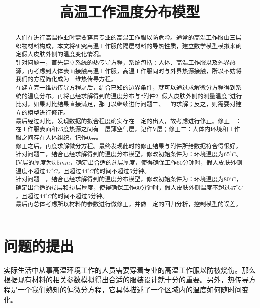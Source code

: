 \documentclass[bwprint]{cumcmthesis}
\title{高温工作温度分布模型}
\begin{document}
 \maketitle
 \begin{abstract}
    \indent 人们在进行高温作业时需要穿着专业的高温工作服以防危险。通常的高温工作服由三层织物材料构成，本文将研究高温工作服的隔层材料的导热性质，建立数学模型模拟来确定假人皮肤外侧的温度变化情况。\\
    \indent 针对问题一，首先建立系统的热传导方程，系统包括：人体、高温工作服以及外界热源。再考虑到人体表面接触高温工作服，高温工作服同时与外界热源接触，所以不妨将我们的方程简化成为一维热传导方程。\\
    \indent 在建立完一维热传导方程之后，结合已知的边界条件，就可以通过求解微分方程得到系统的温度分布。再将已经求解得到的温度分布与“附件2. 假人皮肤外侧的测量温度”进行比对，如果对比结果直接满足，那可以继续进行问题二、三的求解；反之，则需要对建立的模型进行修正。\\
    \indent 最后经过对比，发现数据的拟合程度确实存在一定的出入，故考虑进行修正。修正一：在工作服表面和75度热源之间有一层薄空气层，记作V层；修正二：人体内环境和工作服之间存在人体组织，记作0层。\\
    \indent 修正之后，再度求解微分方程。最终发现此时的修正结果与附件所给数据符合得很好。\\
    \indent 针对问题二，结合已经求解得到的温度分布模型，修改初始条件为：环境温度为$65^{\circ}C$、IV层的厚度为$5.5mm$，确定出合适的$\uppercase\expandafter{\romannumeral2}$层厚度，使得确保工作60分钟时，假人皮肤外侧温度不超过$47^{\circ}C$，且超过$44^{\circ}C$的时间不超过5分钟。\\
    \indent 针对问题三，结合已经求解得到的温度分布模型，修改初始条件为：环境温度为$80^{\circ}C$，确定出合适的$\uppercase\expandafter{\romannumeral2}$层和$\uppercase\expandafter{\romannumeral4}$层厚度，使得确保工作60分钟时，假人皮肤外侧温度不超过$47^{\circ}C$，且超过$44^{\circ}C$的时间不超过5分钟。\\
    \indent 最后再总体考虑所以材料的参数进行微修正，并做一定的回归分析，控制模型的误差。
\end{abstract}

\section{问题的提出}
    \indent 实际生活中从事高温环境工作的人员需要穿着专业的高温工作服以防被烧伤。那么根据现有材料的相关参数模拟得出合适的服装设计就十分的重要。另外，热传导方程是一个我们熟知的偏微分方程，它具体描述了一个区域内的温度如何随时间变化。\\
\end{document}
